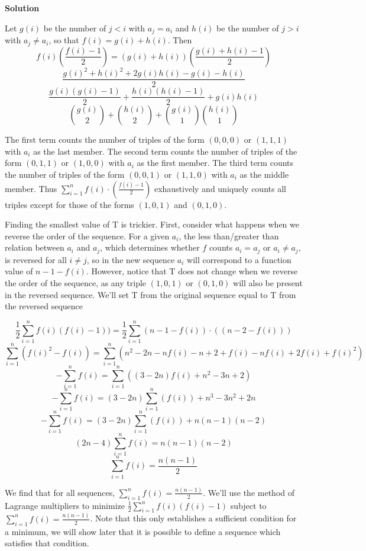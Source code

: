 \begin{enumerate}
 



\textbf{Solution}

Let $g(i)$ be the number of $j<i$ with $a_j = a_i$ and $h(i)$ be the number of $j>i$ with $a_j\neq a_i$, so that $f(i) = g(i) + h(i)$. Then
 \[f(i)\left(\frac{f(i)-1}2\right) = (g(i)+h(i))\left(\frac{g(i)+h(i)-1}2\right)\]
 \[\frac{g(i)^2+h(i)^2+2g(i)h(i)-g(i)-h(i)}{2}\]
 \[\frac{g(i)(g(i)-1)}{2} + \frac{h(i)(h(i)-1)}{2} + g(i)h(i)\]
 \[\binom{g(i)}{2} + \binom{h(i)}{2} + \binom{g(i)}{1}\binom{h(i)}{1}\]

 The first term counts the number of triples of the form $(0,0,0)$ or $(1,1,1)$ with $a_i$ as the last member. The second term counts the number of triples of the form $(0,1,1)$ or $(1,0,0)$ with $a_i$ as the first member. The third term counts the number of triples of the form $(0,0,1)$ or $(1,1,0)$ with $a_i$ as the middle member. Thus $\sum_{i=1}^n f(i)\cdot\left(\frac{f(i)-1}2\right)$ exhaustively and uniquely counts all triples except for those of the forms $(1,0,1)$ and $(0,1,0)$.

 
Finding the smallest value of T is trickier. First, consider what happens when we reverse the order of the sequence. For a given $a_i$, the less than/greater than relation between $a_i$ and $a_j$, which determines whether $f$ counts $a_i = a_j$ or $a_i \neq a_j$, is reversed for all $i \neq j$, so in the new sequence $a_i$ will correspond to a function value of $n-1-f(i)$. However, notice that T does not change when we reverse the order of the sequence, as any triple $(1,0,1)$ or $(0,1,0)$ will also be present in the reversed sequence. We'll set T from the original sequence equal to T from the reversed sequence

 
 \[\frac{1}{2}\sum_{i=1}^n f(i)(f(i)-1)) = \frac{1}{2}\sum_{i=1}^n (n-1-f(i))\cdot\left((n-2-f(i))\right)\]
 \[\sum_{i=1}^n(f(i)^2 - f(i)) = \sum_{i=1}^n (n^2 - 2n -nf(i)-n+2+f(i)-nf(i)+2f(i)+f(i)^2)\]
 \[-\sum_{i=1}^n f(i) = \sum_{i=1}^n ((3-2n)f(i)+n^2-3n+2)\]
 \[-\sum_{i=1}^n f(i) = (3-2n)\sum_{i=1}^n (f(i))+n^3-3n^2+2n\]
 \[-\sum_{i=1}^n f(i) = (3-2n)\sum_{i=1}^n (f(i))+n(n-1)(n-2)\]
 \[(2n-4)\sum_{i=1}^n f(i) = n(n-1)(n-2)\]
 \[\sum_{i=1}^n f(i) = \frac{n(n-1)}{2}\]

 We find that for all sequences, $\sum_{i=1}^n f(i) = \frac{n(n-1)}{2}$. We'll use the method of Lagrange multipliers to minimize $\frac{1}{2}\sum_{i=1}^n f(i)(f(i)-1)$ subject to $\sum_{i=1}^n f(i) = \frac{n(n-1)}{2}$. Note that this only establishes a sufficient condition for a minimum, we will show later that it is possible to define a sequence which satisfies that condition.


\end{enumerate}
